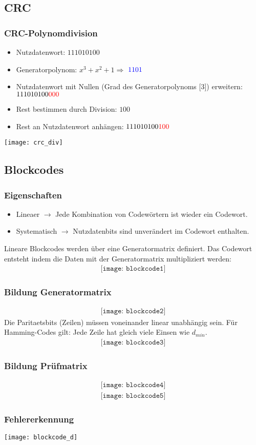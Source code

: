 \subsection{CRC}
\subsubsection{CRC-Polynomdivision}
\begin{itemize}
	\item Nutzdatenwort: $111010100$
	\item Generatorpolynom: $x^3 + x^2 + 1 \Rightarrow$ $\textcolor{blue}{1101}$
	\item Nutzdatenwort mit Nullen (Grad des Generatorpolynoms [3]) erweitern: $111010100\textcolor{red}{000}$
	\item Rest bestimmen durch Division: $100$
	\item Rest an Nutzdatenwort anhängen: $111010100\textcolor{red}{100}$
\end{itemize}
\texttt{[image: crc\_div]}
\subsection{Blockcodes}
\subsubsection{Eigenschaften}
\begin{itemize}
	\item Lineaer $\rightarrow$ Jede Kombination von Codewörtern ist wieder ein Codewort.
	\item Systematisch $\rightarrow$ Nutzdatenbits sind unverändert im Codewort enthalten.
\end{itemize}

Lineare Blockcodes werden über eine Generatormatrix
definiert. Das Codewort entsteht indem die Daten mit der
Generatormatrix multipliziert werden:\\
\begin{align*}
    \texttt{[image: blockcode1]}
\end{align*}
\subsubsection{Bildung Generatormatrix}
\begin{align*}
    \texttt{[image: blockcode2]}
\end{align*}
Die Paritaetsbits (Zeilen) müssen voneinander linear unabhängig sein.
Für Hamming-Codes gilt: Jede Zeile hat gleich viele Einsen wie $d_{min}$.
\begin{align*}
    \texttt{[image: blockcode3]}
\end{align*}
\subsubsection{Bildung Prüfmatrix}
\begin{align*}
    \texttt{[image: blockcode4]}
\end{align*}
\begin{align*}
    \texttt{[image: blockcode5]}
\end{align*}
\subsubsection{Fehlererkennung}
\begin{center}
	\texttt{[image: blockcode\_d]}
\end{center}